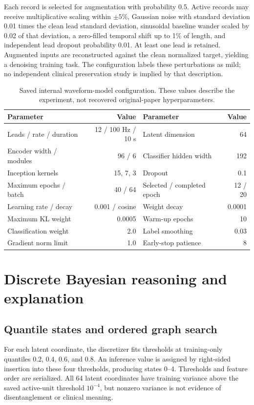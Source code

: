 \documentclass[11pt,a4paper]{article}
\begin{document}
Each record is selected for augmentation with probability 0.5. Active records may receive multiplicative scaling within $\pm5\%$, Gaussian noise with standard deviation 0.01 times the clean lead standard deviation, sinusoidal baseline wander scaled by 0.02 of that deviation, a zero-filled temporal shift up to 1\% of length, and independent lead dropout probability 0.01. At least one lead is retained. Augmented inputs are reconstructed against the clean normalized target, yielding a denoising training task. The configuration labels these perturbations as mild; no independent clinical preservation study is implied by that description.

\begin{table}[htbp]\centering\small
\begin{tabular}{lr@{\qquad}lr}\toprule
Parameter & Value & Parameter & Value\\\midrule
Leads / rate / duration & 12 / 100 Hz / 10 s & Latent dimension & 64\\
Encoder width / modules & 96 / 6 & Classifier hidden width & 192\\
Inception kernels & 15, 7, 3 & Dropout & 0.1\\
Maximum epochs / batch & 40 / 64 & Selected / completed epoch & 12 / 20\\
Learning rate / decay & 0.001 / cosine & Weight decay & 0.0001\\
Maximum KL weight & 0.0005 & Warm-up epochs & 10\\
Classification weight & 2.0 & Label smoothing & 0.03\\
Gradient norm limit & 1.0 & Early-stop patience & 8\\\bottomrule
\end{tabular}
\caption{Saved internal waveform-model configuration. These values describe the experiment, not recovered original-paper hyperparameters.}\label{tab:hyperparameters}\end{table}

\section{Discrete Bayesian reasoning and explanation}
\label{sec:bayes}
\subsection{Quantile states and ordered graph search}
For each latent coordinate, the discretizer fits thresholds at training-only quantiles 0.2, 0.4, 0.6, and 0.8. An inference value is assigned by right-sided insertion into these four thresholds, producing states 0--4. Thresholds and feature order are serialized. All 64 latent coordinates have training variance above the saved active-unit threshold $10^{-4}$, but nonzero variance is not evidence of disentanglement or clinical meaning.
\end{document}

